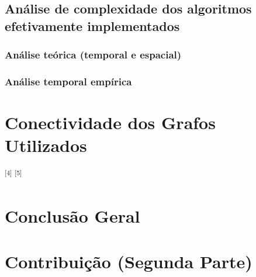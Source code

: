 \documentclass[article, a4paper, 12pt, oneside]{memoir}
\begin{document}
\section{Análise de complexidade dos algoritmos efetivamente implementados}

\subsection{Análise teórica (temporal e espacial)}

\subsection{Análise temporal empírica }

\newpage
\chapter[Conectividade dos Grafos Utilizados][Conectividade dos Grafos Utilizados]{Conectividade dos Grafos Utilizados} \label{\thechapter}

\textsuperscript{[4]} \textsuperscript{[5]}







\newpage
\chapter[Conclusão Geral][Conclusão Geral]{Conclusão Geral} \label{\thechapter}







\newpage
\chapter[Contribuição (Segunda Parte)][Contribuição (Segunda Parte)]{Contribuição (Segunda Parte)} \label{\thechapter}
\end{document}
